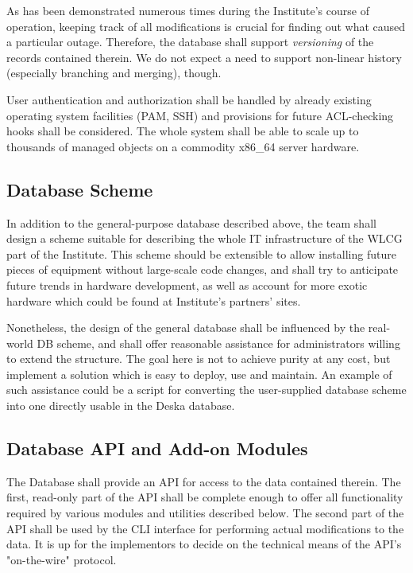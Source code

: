 \documentclass{article}
\begin{document}
As has been demonstrated numerous times during the Institute's course of operation, keeping track of all modifications is crucial
for finding out what caused a particular outage.  Therefore, the database shall support {\em versioning} of the records contained
therein.  We do not expect a need to support non-linear history (especially branching and merging), though.

User authentication and authorization shall be handled by already existing operating system facilities (PAM, SSH) and provisions
for future ACL-checking hooks shall be considered.  The whole system shall be able to scale up to thousands of managed objects on
a commodity x86\_64 server hardware.

\subsection{Database Scheme}

In addition to the general-purpose database described above,
the team shall design a scheme suitable for describing the whole IT infrastructure of the WLCG part of the Institute.
This scheme should be extensible to allow installing future pieces of equipment without large-scale code changes, and shall try to
anticipate future trends in hardware development, as well as account for more exotic hardware which could be found at Institute's
partners' sites.

Nonetheless, the design of the general database shall be influenced by the real-world DB scheme, and shall offer reasonable
assistance for administrators willing to extend the structure.  The goal here is not to achieve purity at any cost, but implement
a solution which is easy to deploy, use and maintain. An example of such assistance could be a script for converting the
user-supplied database scheme into one directly usable in the Deska database. 

\subsection{Database API and Add-on Modules}

The Database shall provide an API for access to the data contained therein. The first, read-only part of the API shall be complete
enough to offer all functionality required by various modules and utilities described below.  The second part of the API shall
be used by the CLI interface for performing actual modifications to the data.  It is up for the implementors to decide on the
technical means of the API's "on-the-wire" protocol.
\end{document}
